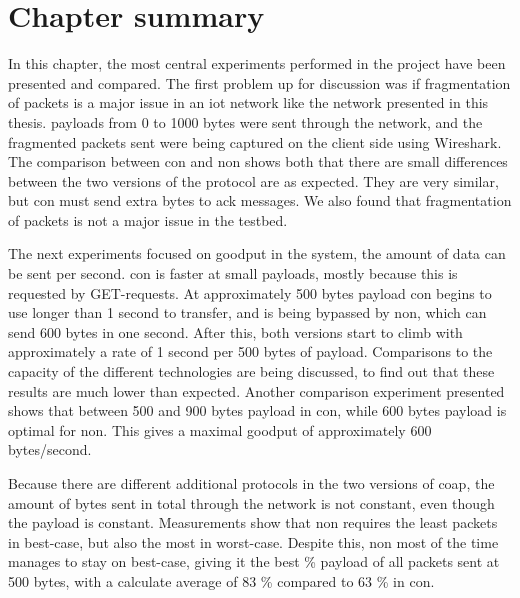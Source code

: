 \section{Chapter summary}

\noindent In this chapter, the most central experiments performed in the project have been presented and compared. The first problem up for discussion was if fragmentation of packets is a major issue in an \gls{iot} network like the network presented in this thesis. \Glspl{payload} from 0 to 1000 bytes were sent through the network, and the fragmented packets sent were being captured on the client side using Wireshark. The comparison between \gls{con} and \gls{non} shows both that there are small differences between the two versions of the protocol are as expected. They are very similar, but \gls{con} must send extra bytes to \gls{ack} messages. We also found that fragmentation of packets is not a major issue in the testbed. 

\noindent The next experiments focused on \gls{goodput} in the system, the amount of data can be sent per second. \gls{con} is faster at small \glspl{payload}, mostly because this is requested by GET-requests. At approximately 500 bytes \gls{payload} \gls{con} begins to use longer than 1 second to transfer, and is being bypassed by \gls{non}, which can send 600 bytes in one second. After this, both versions start to climb with approximately a rate of 1 second per 500 bytes of \gls{payload}. Comparisons to the capacity of the different technologies are being discussed, to find out that these results are much lower than expected. Another comparison experiment presented shows that between 500 and 900 bytes \gls{payload} in \gls{con}, while 600 bytes \gls{payload} is optimal for \gls{non}. This gives a maximal \gls{goodput} of approximately 600 bytes/second. 

\noindent Because there are different additional protocols in the two versions of \gls{coap}, the amount of bytes sent in total through the network is not constant, even though the \gls{payload} is constant. Measurements show that \gls{non} requires the least packets in best-case, but also the most in worst-case. Despite this, \gls{non} most of the time manages to stay on best-case, giving it the best \% payload of all packets sent at 500 bytes, with a calculate average of 83 \% compared to 63 \% in \gls{con}.   


